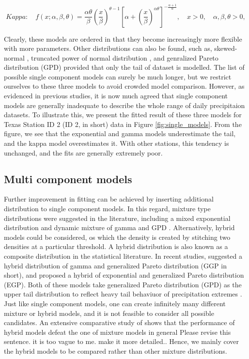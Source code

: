 \documentclass[12pt]{article}\usepackage[]{graphicx}\usepackage[]{color}
\newcommand{\cred}{ \color{red}}
\begin{document}
\begin{equation}
  \label{eq:kappa.pdf} 
Kappa: \quad   f(x ; \alpha, \beta, \theta) = \frac {\alpha \theta} {\beta} (\frac {x} {\beta})^{\theta - 1} [\alpha + (\frac {x} {\beta})^{\alpha \theta}]^{-\frac {\alpha + 1} {\alpha}}, \quad x > 0, \quad \alpha, \beta, \theta > 0,
\end{equation}

Clearly, these models are ordered in that they become increasingly more flexible with more parameters. Other distributions can also be found, such as, skewed-normal \citep{wan2005stochastic}, truncated power of normal distribution \citep{bardossy1992space}, and genralized Pareto distribution (GPD) provided that only the tail of dataset is modelled. The list of possible single component models can surely be much longer, but we restrict ourselves to these three models to avoid crowded model comparison. However, as evidenced in previous studies, it is now much agreed that single component models are generally inadequate to describe the whole range of daily precipitaion datasets. To illustrate this, we present the fitted result of these three models for Texas Station ID 2 (ID 2, in short) data in Figure \ref{fig:single_models}. From the figure, we see that the exponential and gamma models underestimate the tail, and the kappa model overestimates it. With other stations, this tendency is unchanged, and the fits are generally extremely poor. 


	\subsection{Multi component models} 

Further improvement in fitting can be achieved by inserting additional distribution to single component models. In this regard, mixture type distributions were suggested in the literature, including a mixed exponential distribution \citep{wilks1999interannual} and dynamic mixture of gamma and GPD \citep{vrac2007stochastic}. Alternatively, hybrid models could be considered, os which the density is created by stitching two densities at a particular threshold. A hybrid distribution is also known as a composite distribution in the statistical literature.  In recent studies, \cite{furrer2008improving} suggested  a hybrid distribution of gamma and generalized Pareto distribution (GGP in short), and \cite{li2012simulation} proposed a hybrid of exponential and generalized Pareto distribution (EGP). Both of these models take generalized Pareto distribution (GPD) as the upper tail distribution to reflect heavy tail behaviuor of precipitation extremes \citep{koutsoyiannis2004statistics}. Just like single component models, one can create infinitely many different mixture or hybrid models, and it is not feasible to consider all possible candidates. An extensive comparative study of \cite{li2012simulation} shows that the performance of hybrid models defeat the one of mixture models in general {\cred Please revise this sentence. it is too vague to me. make it more detailed.}. Hence, we mainly cover the hybrid models to be compared rather than other mixture distributions. 
\end{document}
